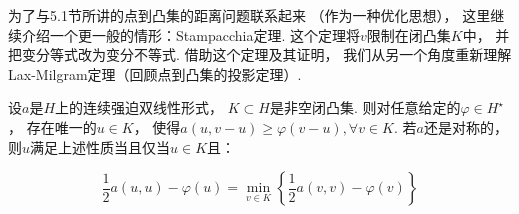 \medskip

为了与5.1节所讲的点到凸集的距离问题联系起来
（作为一种优化思想），
这里继续介绍一个更一般的情形：Stampacchia定理.
这个定理将$v$限制在闭凸集$K$中，
并把变分等式改为变分不等式.
借助这个定理及其证明，
我们从另一个角度重新理解Lax-Milgram定理（回顾点到凸集的投影定理）.


\begin{theorem}[Stampacchia定理]
    设$a$是$H$上的连续强迫双线性形式，
    $K \subset H$是非空闭凸集.
    则对任意给定的$\varphi \in H^\star$，
    存在唯一的$u \in K$，
    使得$a(u , v-u) \ge \varphi (v - u), \forall v \in K$.
    若$a$还是对称的，
    则$u$满足上述性质当且仅当$u \in K$且：

    \[
    \frac{1}{2} a(u,u) - \varphi(u) = \min_{v \in K} \left\{ \frac{1}{2} a(v,v) - \varphi (v) \right\}
    \]
\end{theorem}

